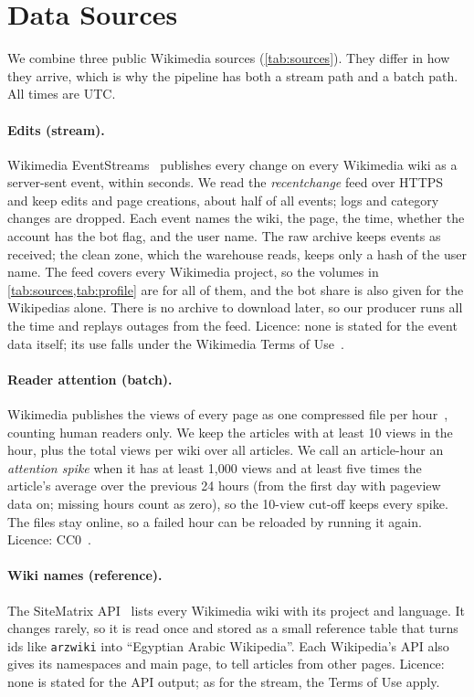 \section{Data Sources}\label{sec:data}

We combine three public Wikimedia sources (\cref{tab:sources}). They differ in how they arrive, which
is why the pipeline has both a stream path and a batch path. All times are UTC.

\paragraph{Edits (stream).} Wikimedia EventStreams~\cite{wikimedia2026eventstreams} publishes every change
on every Wikimedia wiki as a server-sent event, within seconds. We read the \emph{recentchange} feed
over HTTPS and keep edits and page creations, about half of all events; logs and category changes are
dropped. Each event names the wiki, the page, the time, whether the account has the bot flag, and the
user name. The raw archive keeps events as received; the clean zone, which the warehouse reads, keeps
only a hash of the user name. The feed covers every Wikimedia project, so the volumes in
\cref{tab:sources,tab:profile} are for all of them, and the bot share is also given for the Wikipedias
alone. There is no archive to download later, so our producer runs all the time and replays outages
from the feed. Licence: none is stated for the event data itself; its use falls under the Wikimedia
Terms of Use~\cite{wikimedia2026terms}.

\paragraph{Reader attention (batch).} Wikimedia publishes the views of every page as one compressed file
per hour~\cite{wikimedia2026pageviews}, counting human readers only. We keep the articles with at least
10 views in the hour, plus the total views per wiki over all articles. We call an article-hour an
\emph{attention spike} when it has at least 1{,}000 views and at least five times the article's average
over the previous 24 hours (from the first day with pageview data on; missing hours count as zero), so the 10-view cut-off keeps every spike. The files stay online, so a failed
hour can be reloaded by running it again. Licence: CC0~\cite{wikimedia2026dumpslegal}.

\paragraph{Wiki names (reference).} The SiteMatrix API~\cite{wikimedia2026sitematrix} lists every
Wikimedia wiki with its project and language. It changes rarely, so it is read once and stored as a small
reference table that turns ids like \texttt{arzwiki} into ``Egyptian Arabic Wikipedia''. Each
Wikipedia's API also gives its namespaces and main page, to tell articles from other pages.
Licence: none is stated for the API output; as for the stream, the Terms of Use apply.

